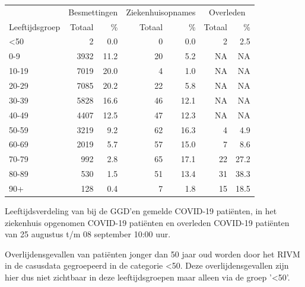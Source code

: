 \documentclass[
  english,
  man,floatsintext]{apa6}
\begin{document}
\begin{table}
\centering\begingroup\fontsize{11}{13}\selectfont

\begin{threeparttable}
\begin{tabular}{lrrrrrr}
\toprule
\multicolumn{1}{c}{ } & \multicolumn{2}{c}{Besmettingen} & \multicolumn{2}{c}{Ziekenhuisopnames} & \multicolumn{2}{c}{Overleden} \\
\cmidrule(l{3pt}r{3pt}){2-3} \cmidrule(l{3pt}r{3pt}){4-5} \cmidrule(l{3pt}r{3pt}){6-7}
Leeftijdsgroep & Totaal & \% & Totaal & \% & Totaal & \%\\
\midrule
<50 & 2 & 0.0 & 0 & 0.0 & 2 & 2.5\\
0-9 & 3932 & 11.2 & 20 & 5.2 & NA & NA\\
10-19 & 7019 & 20.0 & 4 & 1.0 & NA & NA\\
20-29 & 7085 & 20.2 & 22 & 5.8 & NA & NA\\
30-39 & 5828 & 16.6 & 46 & 12.1 & NA & NA\\
40-49 & 4407 & 12.5 & 47 & 12.3 & NA & NA\\
50-59 & 3219 & 9.2 & 62 & 16.3 & 4 & 4.9\\
60-69 & 2019 & 5.7 & 57 & 15.0 & 7 & 8.6\\
70-79 & 992 & 2.8 & 65 & 17.1 & 22 & 27.2\\
80-89 & 530 & 1.5 & 51 & 13.4 & 31 & 38.3\\
90+ & 128 & 0.4 & 7 & 1.8 & 15 & 18.5\\
\bottomrule
\end{tabular}
\begin{tablenotes}
\item[1] Leeftijdsverdeling van bij de GGD’en gemelde COVID-19 patiënten, in het ziekenhuis opgenomen COVID-19 patiënten en overleden COVID-19 patiënten van 25 augustus t/m 08 september 10:00 uur.
\item[2] Overlijdensgevallen van patiënten jonger dan 50 jaar oud worden door het RIVM in de casusdata gegroepeerd in de categorie <50. Deze overlijdensgevallen zijn hier dus niet zichtbaar in deze leeftijdsgroepen maar alleen via de groep '<50'.
\end{tablenotes}
\end{threeparttable}
\endgroup{}
\end{table}

\newpage
\end{document}
